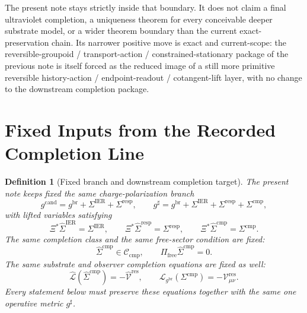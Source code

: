 \documentclass[11pt]{article}
\newcommand{\ObserverMap}{\Xi}
\newcommand{\ObserverMetric}{g^{\mathrm{br}}}
\newcommand{\CandidateMetric}{g^{\mathrm{cand}}}
\newcommand{\CompletedMetric}{g^{\sharp}}
\newcommand{\BaseShift}{\Sigma^{\mathrm{IER}}}
\newcommand{\ResponseShift}{\Sigma^{\mathrm{resp}}}
\newcommand{\CompShift}{\Sigma^{\mathrm{cmp}}}
\newcommand{\BaseLift}{\widehat\Sigma^{\mathrm{IER}}}
\newcommand{\ResponseLift}{\widehat\Sigma^{\mathrm{resp}}}
\newcommand{\CompLift}{\widehat\Sigma^{\mathrm{cmp}}}
\newcommand{\ResidualCore}{\mathcal V_{\mu\nu}^{\mathrm{res}}}
\newcommand{\ResidualLift}{\widehat{\mathcal V}^{\mathrm{res}}}
\newcommand{\SubReducedEin}{\widehat{\mathcal L}}
\newcommand{\FreeProj}{\Pi_{\mathrm{free}}}
\newcommand{\ReducedEin}{\mathcal L_{\ObserverMetric}}
\newcommand{\CompClass}{\mathscr C_{\mathrm{cmp}}}
\newtheorem{definition}{Definition}
\begin{document}
The present note stays strictly inside that boundary. It does not claim a final ultraviolet completion, a uniqueness theorem for every conceivable deeper substrate model, or a wider theorem boundary than the current exact-preservation chain. Its narrower positive move is exact and current-scope: the reversible-groupoid / transport-action / constrained-stationary package of the previous note is itself forced as the reduced image of a still more primitive reversible history-action / endpoint-readout / cotangent-lift layer, with no change to the downstream completion package.

\section{Fixed Inputs from the Recorded Completion Line}

\begin{definition}[Fixed branch and downstream completion target]
\label{def:fixed_branch}
The present note keeps fixed the same charge-polarization branch
\begin{equation}
\CandidateMetric
=
\ObserverMetric+\BaseShift+\ResponseShift,
\qquad
\CompletedMetric
=
\ObserverMetric+\BaseShift+\ResponseShift+\CompShift,
\label{eq:fixed_metrics}
\end{equation}
with lifted variables satisfying
\begin{equation}
\ObserverMap^*\BaseLift=\BaseShift,
\qquad
\ObserverMap^*\ResponseLift=\ResponseShift,
\qquad
\ObserverMap^*\CompLift=\CompShift.
\label{eq:fixed_lifts}
\end{equation}
The same completion class and the same free-sector condition are fixed:
\begin{equation}
\CompLift\in\CompClass,
\qquad
\FreeProj\CompLift=0.
\label{eq:fixed_free}
\end{equation}
The same substrate and observer completion equations are fixed as well:
\begin{equation}
\SubReducedEin(\CompLift)=-\ResidualLift,
\qquad
\ReducedEin(\CompShift)=-\ResidualCore.
\label{eq:fixed_solves}
\end{equation}
Every statement below must preserve these equations together with the same one operative metric \(\CompletedMetric\).
\end{definition}
\end{document}
